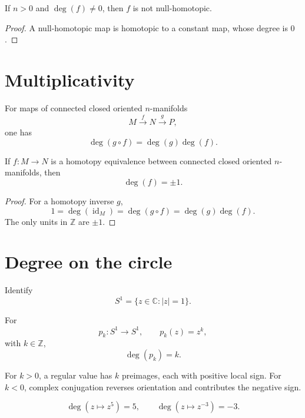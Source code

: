 \begin{corollary}
\label{cor:viii03-nonzero}
If \(n>0\) and \(\deg(f)\ne0\), then \(f\) is not null-homotopic.
\end{corollary}

\begin{proof}
A null-homotopic map is homotopic to a constant map, whose degree is \(0\).
\end{proof}

\section{Multiplicativity}

\begin{theorem}
\label{thm:viii03-multiplicative}
For maps of connected closed oriented \(n\)-manifolds
\[
M\xrightarrow{f}N\xrightarrow{g}P,
\]
one has
\[
\deg(g\circ f)=\deg(g)\deg(f).
\]
\end{theorem}

\begin{corollary}
\label{cor:viii03-equivalence}
If \(f:M\to N\) is a homotopy equivalence between connected closed oriented
\(n\)-manifolds, then
\[
\deg(f)=\pm1.
\]
\end{corollary}

\begin{proof}
For a homotopy inverse \(g\),
\[
1=\deg(\operatorname{id}_M)
=\deg(g\circ f)
=\deg(g)\deg(f).
\]
The only units in \(\mathbb Z\) are \(\pm1\).
\end{proof}

\section{Degree on the circle}

Identify
\[
S^1=\{z\in\mathbb C:|z|=1\}.
\]

\begin{theorem}
\label{thm:viii03-power}
For
\[
p_k:S^1\to S^1,
\qquad
p_k(z)=z^k,
\]
with \(k\in\mathbb Z\),
\[
\deg(p_k)=k.
\]
\end{theorem}

For \(k>0\), a regular value has \(k\) preimages, each with positive local sign.
For \(k<0\), complex conjugation reverses orientation and contributes the
negative sign.

\begin{example}
\[
\deg(z\mapsto z^5)=5,
\qquad
\deg(z\mapsto z^{-3})=-3.
\]
\end{example}


